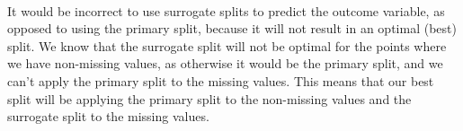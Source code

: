 \documentclass[11pt]{article}
\begin{document}
\begin{center}

\ \\
\end{center}


\vspace{5 mm}
\noindent
It would be incorrect to use surrogate splits to predict the outcome variable, as opposed to using the primary split, because it will not result in an optimal (best) split.  We know that the surrogate split will not be optimal for the points where we have non-missing values, as otherwise it would be the primary split, and we can't apply the primary split to the missing values.  This means that our best split will be applying the primary split to the non-missing values and the surrogate split to the missing values. 
\end{document}
